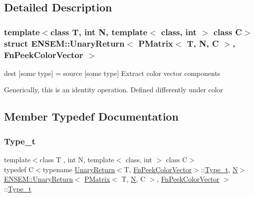 \subsection{Detailed Description}
\subsubsection*{template$<$class T, int N, template$<$ class, int $>$ class C$>$\newline
struct E\+N\+S\+E\+M\+::\+Unary\+Return$<$ P\+Matrix$<$ T, N, C $>$, Fn\+Peek\+Color\+Vector $>$}

dest \mbox{[}some type\mbox{]} = source \mbox{[}some type\mbox{]} Extract color vector components

Generically, this is an identity operation. Defined differently under color 

\subsection{Member Typedef Documentation}
\mbox{\label{structENSEM_1_1UnaryReturn_3_01PMatrix_3_01T_00_01N_00_01C_01_4_00_01FnPeekColorVector_01_4_a4b620d05d14bc1c08dc440f5f444f0e9}} 
\subsubsection{\texorpdfstring{Type\_t}{Type\_t}\hspace{0.1cm}{\footnotesize\ttfamily [1/3]}}
{\footnotesize\ttfamily template$<$class T , int N, template$<$ class, int $>$ class C$>$ \\
typedef C$<$typename \mbox{\hyperlink{structENSEM_1_1UnaryReturn}{Unary\+Return}}$<$T, \mbox{\hyperlink{structENSEM_1_1FnPeekColorVector}{Fn\+Peek\+Color\+Vector}}$>$\+::\mbox{\hyperlink{structENSEM_1_1UnaryReturn_3_01PMatrix_3_01T_00_01N_00_01C_01_4_00_01FnPeekColorVector_01_4_a4b620d05d14bc1c08dc440f5f444f0e9}{Type\+\_\+t}}, \mbox{\hyperlink{adat__devel_2lib_2hadron_2operator__name__util_8cc_a7722c8ecbb62d99aee7ce68b1752f337}{N}}$>$ \mbox{\hyperlink{structENSEM_1_1UnaryReturn}{E\+N\+S\+E\+M\+::\+Unary\+Return}}$<$ \mbox{\hyperlink{classENSEM_1_1PMatrix}{P\+Matrix}}$<$ T, \mbox{\hyperlink{adat__devel_2lib_2hadron_2operator__name__util_8cc_a7722c8ecbb62d99aee7ce68b1752f337}{N}}, C $>$, \mbox{\hyperlink{structENSEM_1_1FnPeekColorVector}{Fn\+Peek\+Color\+Vector}} $>$\+::\mbox{\hyperlink{structENSEM_1_1UnaryReturn_3_01PMatrix_3_01T_00_01N_00_01C_01_4_00_01FnPeekColorVector_01_4_a4b620d05d14bc1c08dc440f5f444f0e9}{Type\+\_\+t}}}

